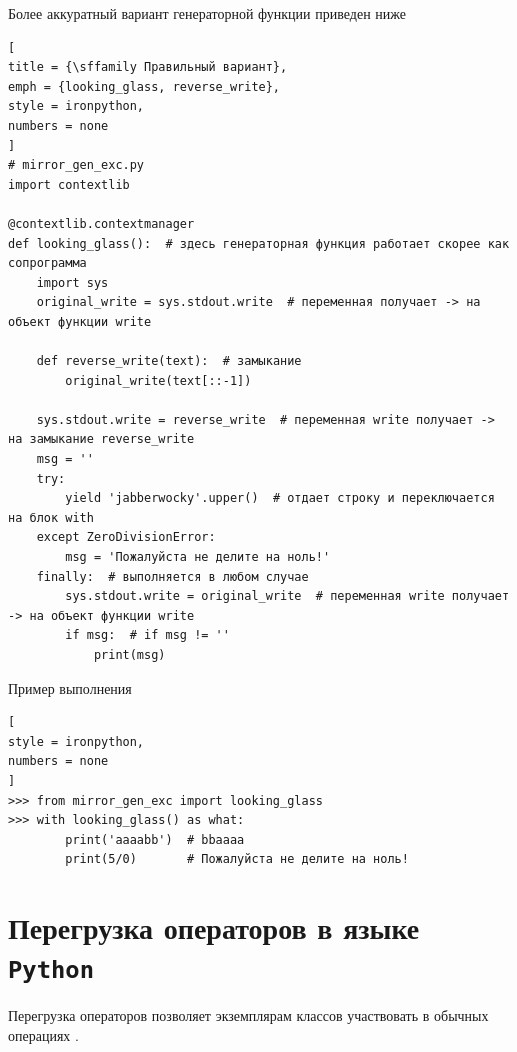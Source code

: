 \documentclass[%
	11pt,
	a4paper,
	utf8,
		]{article}
\begin{document}
Более аккуратный вариант генераторной функции приведен ниже

\begin{lstlisting}[
title = {\sffamily Правильный вариант},
emph = {looking_glass, reverse_write},
style = ironpython,
numbers = none
]
# mirror_gen_exc.py
import contextlib

@contextlib.contextmanager
def looking_glass():  # здесь генераторная функция работает скорее как сопрограмма
    import sys
    original_write = sys.stdout.write  # переменная получает -> на объект функции write

    def reverse_write(text):  # замыкание
        original_write(text[::-1])

    sys.stdout.write = reverse_write  # переменная write получает -> на замыкание reverse_write
    msg = ''
    try:
        yield 'jabberwocky'.upper()  # отдает строку и переключается на блок with
    except ZeroDivisionError:
        msg = 'Пожалуйста не делите на ноль!'
    finally:  # выполняется в любом случае
        sys.stdout.write = original_write  # переменная write получает -> на объект функции write
        if msg:  # if msg != ''
            print(msg)
\end{lstlisting}

Пример выполнения

\begin{lstlisting}[
style = ironpython,
numbers = none
]
>>> from mirror_gen_exc import looking_glass
>>> with looking_glass() as what:
        print('aaaabb')  # bbaaaa
        print(5/0)       # Пожалуйста не делите на ноль!
\end{lstlisting}


\section{Перегрузка операторов в языке \texttt{Python}}

Перегрузка операторов позволяет экземплярам классов участвовать в обычных операциях \cite{prohorenok:python-2016}.
\end{document}

